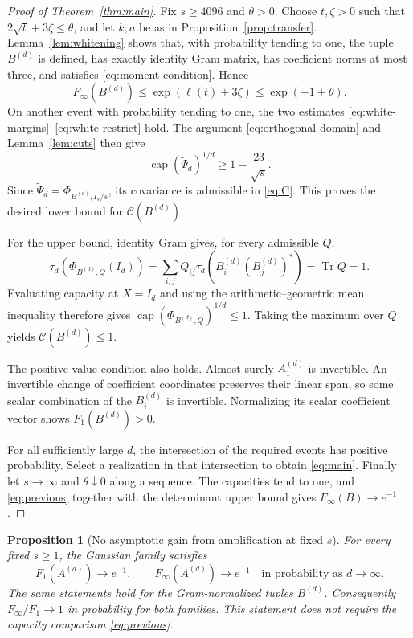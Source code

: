 \documentclass[11pt]{article}
\newtheorem{proposition}[theorem]{Proposition}
\theoremstyle{remark}
\DeclareMathOperator{\Tr}{Tr}
\DeclareMathOperator{\capop}{cap}
\newcommand{\Finf}{F_{\infty}}
\newcommand{\calC}{\mathcal C}
\begin{document}
\begin{proof}[Proof of Theorem~\ref{thm:main}]
Fix $s\geq4096$ and $\theta>0$. Choose $t,\zeta>0$ such that
$2\sqrt t+3\zeta\leq\theta$, and let $k,a$ be as in
Proposition~\ref{prop:transfer}. Lemma~\ref{lem:whitening}
shows that, with probability tending to one, the tuple
$B^{(d)}$ is defined, has exactly identity Gram matrix,
has coefficient norms at most three, and satisfies
\eqref{eq:moment-condition}. Hence
\[
 \Finf(B^{(d)})
 \leq\exp(\ell(t)+3\zeta)
 \leq\exp(-1+\theta).
\]
On another event with probability tending to one, the two
estimates \eqref{eq:white-margins}--\eqref{eq:white-restrict}
hold. The argument \eqref{eq:orthogonal-domain} and
Lemma~\ref{lem:cuts} then give
\[
 \capop(\widetilde\Psi_d)^{1/d}
       \geq1-\frac{23}{\sqrt{s}}.
\]
Since $\widetilde\Psi_d=\Phi_{B^{(d)},I_s/s}$, its covariance
is admissible in \eqref{eq:C}. This proves the desired lower
bound for $\calC(B^{(d)})$.

For the upper bound, identity Gram gives, for every admissible $Q$,
\[
 \tau_d(\Phi_{B^{(d)},Q}(I_d))
   =\sum_{i,j}Q_{ij}\tau_d(B_i^{(d)}(B_j^{(d)})^*)
   =\Tr Q=1.
\]
Evaluating capacity at $X=I_d$ and using the
arithmetic--geometric mean inequality therefore gives
$\capop(\Phi_{B^{(d)},Q})^{1/d}\leq1$.
Taking the maximum over $Q$ yields $\calC(B^{(d)})\leq1$.

The positive-value condition also holds. Almost surely
$A_1^{(d)}$ is invertible. An invertible change of coefficient
coordinates preserves their linear span, so some scalar
combination of the $B_i^{(d)}$ is invertible. Normalizing its
scalar coefficient vector shows $F_1(B^{(d)})>0$.

For all sufficiently large $d$, the intersection of the required
events has positive probability. Select a realization in that
intersection to obtain \eqref{eq:main}.
Finally let $s\to\infty$ and $\theta\downarrow0$ along a sequence.
The capacities tend to one, and \eqref{eq:previous} together with
the determinant upper bound gives $\Finf(B)\to e^{-1}$.
\end{proof}

\begin{proposition}[No asymptotic gain from amplification at fixed $s$]
\label{prop:fixed-s}
For every fixed $s\geq1$, the Gaussian family satisfies
\[
 F_1(A^{(d)})\longrightarrow e^{-1},
 \qquad \Finf(A^{(d)})\longrightarrow e^{-1}
 \quad\text{in probability as }d\to\infty.
\]
The same statements hold for the Gram-normalized tuples $B^{(d)}$.
Consequently $\Finf/F_1\to1$ in probability for both families.
This statement does not require the capacity comparison
\eqref{eq:previous}.
\end{proposition}
\end{document}
